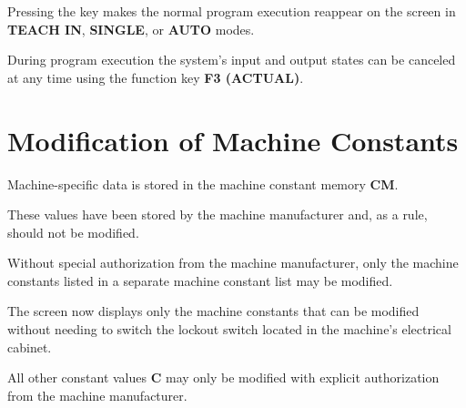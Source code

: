 Pressing the key makes the normal program execution reappear on the screen in \textbf{TEACH IN}, \textbf{SINGLE}, or \textbf{AUTO} modes.

During program execution the system's input and output states can be canceled at any time using the function key \textbf{F3 (ACTUAL)}.

\newpage

\setcounter{section}{4}
\section{Modification of Machine Constants}

Machine-specific data is stored in the machine constant memory \textbf{CM}.

These values have been stored by the machine manufacturer and, as a rule, should not be modified.

Without special authorization from the machine manufacturer, only the machine constants listed in a separate machine constant list may be modified.

\procedure

\begin{itemize}
\end{itemize}

\vspace{.5cm}

\begin{itemize}
\end{itemize}

\vspace{.5cm}

\begin{itemize}
\end{itemize}

The screen now displays only the machine constants that can be modified without needing to switch the lockout switch located in the machine’s electrical cabinet.

All other constant values \textbf{C} may only be modified with explicit authorization from the machine manufacturer.

\procedure

\begin{itemize}
\end{itemize}

